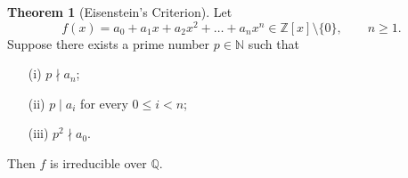\documentclass[12pt]{article}
\theoremstyle{definition} %
\newtheorem{theorem}{Theorem}
\theoremstyle{plain} %
\begin{document}
    \begin{theorem}[Eisenstein’s Criterion]
      Let 
      \[
         f(x)=a_{0}+a_{1}x+a_{2}x^{2}+\dots+a_{n}x^{n}\in\mathbb{Z}[x]\setminus\{0\},
         \qquad n\ge 1.
      \]
      Suppose there exists a prime number \(p\in\mathbb{N}\) such that 
      \begin{enumerate}
         \item[(i)] \(p\nmid a_{n}\);  \hfill           %
         \item[(ii)] \(p \mid a_{i}\) for every \(0\le i<n\); \hfill %
         \item[(iii)] \(p^{2}\nmid a_{0}\).                       %
      \end{enumerate}
      Then \(f\) is irreducible over \(\mathbb{Q}\).
      \end{theorem}
      
\end{document}
